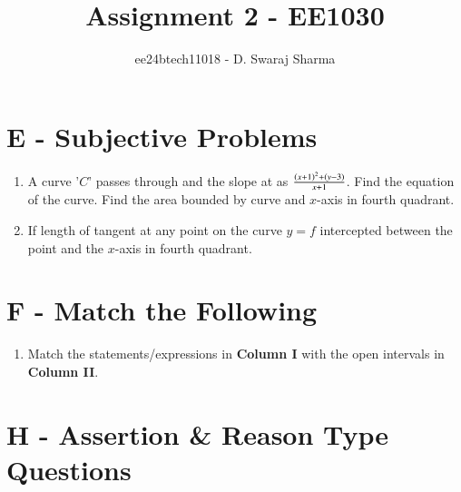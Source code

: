 \documentclass[journal]{IEEEtran}
\begin{document}

\vspace{3cm}

\title{Assignment 2 - EE1030}
\author{ee24btech11018 - D. Swaraj Sharma}

{\let\newpage\relax\maketitle}

\renewcommand{\thefigure}{\theenumi}
\renewcommand{\thetable}{\theenumi}
\setlength{\intextsep}{10pt}

\renewcommand{\thetable}{\theenumi}

\section{E - Subjective Problems}

\begin{enumerate}[label={\arabic*.}]

	\item A curve '$C$' passes through  and the slope at  as $\frac{\left(x+1\right)^2+\left(y-3\right)}{x+1}$. Find the equation of the curve. Find the area bounded by curve and $x$-axis in fourth quadrant. 
		\hfill{}
	
\item If length of tangent at any point on the curve $y=f$ intercepted between the point and the $x$-axis in fourth quadrant. 
	\hfill{}

\end{enumerate}

\section{F - Match the Following}

\begin{enumerate}

\item Match the statements/expressions in \textbf{Column I} with the open intervals in \textbf{Column II}.

\end{enumerate}

\section{H - Assertion \& Reason Type Questions}
\end{document}
